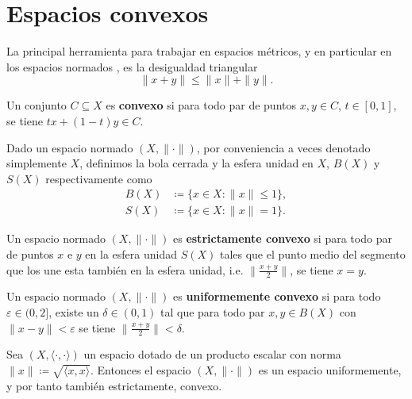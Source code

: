 \section{Espacios convexos}

La principal herramienta para trabajar en espacios métricos, y en particular en los espacios normados \cite{babb}, es la desigualdad triangular 
$$
    \| x + y \| \leq \| x \| + \| y \|.
$$

\begin{definition}
    Un conjunto $ C \subseteq X $ es {\bf convexo} si para todo par de puntos $ x, y \in C $, $ t \in [0, 1] $, se tiene $ tx + (1-t)y \in C $.
\end{definition}

Dado un espacio normado $ (X, \| \cdot \|) $, por conveniencia a veces denotado simplemente $ X $, definimos la bola cerrada y la esfera unidad en $ X $, $ B(X) $ y $ S(X) $ respectivamente como
\begin{align}
    B(X) &\coloneq \{x \in X \colon \| x \| \leq 1 \}, \\
    S(X) &\coloneq \{x \in X \colon \| x \| = 1 \}.
\end{align}

\begin{definition}
    Un espacio normado $ (X, \| \cdot \|) $ es {\bf estrictamente convexo} si para todo par de puntos $ x $ e $ y $ en la esfera unidad $ S(X) $ tales que el punto medio del segmento que los une esta también en la esfera unidad, i.e. $\| \frac{x+y}{2}\| $, se tiene $ x = y $.
\end{definition}

\begin{definition}
    Un espacio normado $ (X, \| \cdot \|) $ es {\bf uniformemente convexo} si para todo $ \varepsilon \in (0, 2] $, existe un $ \delta \in (0, 1) $ tal que para todo par $ x, y \in B(X) $ con $ \| x - y \| < \varepsilon $ se tiene $ \| \frac{x+y}{2} \| < \delta $.
\end{definition}

\begin{proposition} \label{prop:hilbert-convex}
    Sea $ (X, \langle \cdot, \cdot \rangle) $ un espacio dotado de un producto escalar con norma $ \|x\| \coloneq \sqrt{\langle x, x \rangle} $. Entonces el espacio $ (X, \|\cdot\|) $ es un espacio uniformemente, y por tanto también estrictamente, convexo. 
\end{proposition}

